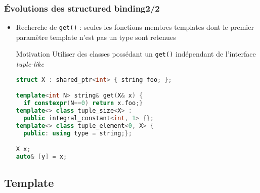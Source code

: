 \documentclass[C++.tex]{subfiles}
\begin{document}
\begin{frame}[fragile]
	\frametitle{Évolutions des structured binding\titlehfill{}2/2}
	\begin{itemize}
		\item Recherche de \lstinline|get()| : seules les fonctions membres templates dont le premier paramètre template n'est pas un type sont retenues

		\begin{block}{Motivation}
			Utiliser des classes possédant un \lstinline|get()| indépendant de l'interface \textit{tuple-like}
		\end{block}

		\begin{lstlisting}[language=C++]
struct X : shared_ptr<int> { string foo; };

template<int N> string& get(X& x) { 
  if constexpr(N==0) return x.foo;}
template<> class tuple_size<X> : 
  public integral_constant<int, 1> {};
template<> class tuple_element<0, X> {
  public: using type = string;};

X x;
auto& [y] = x;\end{lstlisting}

	\end{itemize}
\end{frame}

\subsection*{Template}
\end{document}
